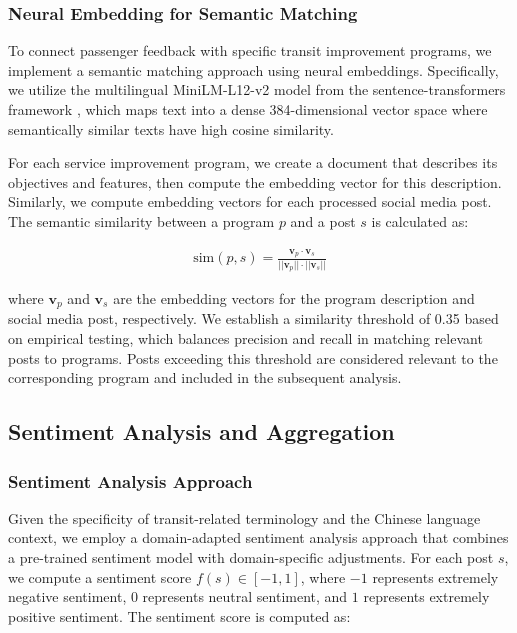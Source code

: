 \documentclass[a4paper,fleqn,12pt]{cas-sc}
\begin{document}
\subsubsection{Neural Embedding for Semantic Matching}

To connect passenger feedback with specific transit improvement programs, we implement a semantic matching approach using neural embeddings. Specifically, we utilize the multilingual MiniLM-L12-v2 model from the sentence-transformers framework \citep{reimers2019sentence}, which maps text into a dense 384-dimensional vector space where semantically similar texts have high cosine similarity.

For each service improvement program, we create a document that describes its objectives and features, then compute the embedding vector for this description. Similarly, we compute embedding vectors for each processed social media post. The semantic similarity between a program $p$ and a post $s$ is calculated as:

\begin{align}
\text{sim}(p, s) = \frac{\mathbf{v}_p \cdot \mathbf{v}_s}{||\mathbf{v}_p|| \cdot ||\mathbf{v}_s||}
\end{align}

where $\mathbf{v}_p$ and $\mathbf{v}_s$ are the embedding vectors for the program description and social media post, respectively. We establish a similarity threshold of 0.35 based on empirical testing, which balances precision and recall in matching relevant posts to programs. Posts exceeding this threshold are considered relevant to the corresponding program and included in the subsequent analysis.

\subsection{Sentiment Analysis and Aggregation}

\subsubsection{Sentiment Analysis Approach}

Given the specificity of transit-related terminology and the Chinese language context, we employ a domain-adapted sentiment analysis approach that combines a pre-trained sentiment model with domain-specific adjustments. For each post $s$, we compute a sentiment score $f(s) \in [-1, 1]$, where $-1$ represents extremely negative sentiment, $0$ represents neutral sentiment, and $1$ represents extremely positive sentiment. The sentiment score is computed as:
\end{document}
